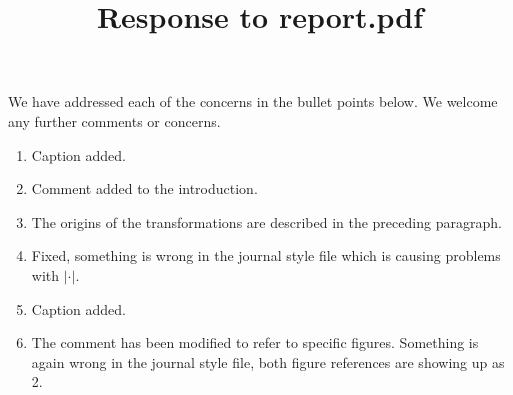 \documentclass{amsart}
\title{Response to report.pdf}
\begin{document}
  
  \maketitle

  We have addressed each of the concerns in the bullet points below.  We welcome any further comments or concerns.
  \begin{enumerate}
    \item Caption added.
    \item Comment added to the introduction.
    \item The origins of the transformations are described in the preceding paragraph.
    \item Fixed, something is wrong in the journal style file which is causing problems with $|\cdot|$.
    \item Caption added.
    \item The comment has been modified to refer to specific figures.  Something is again wrong in the journal style file, both figure references are showing up as 2.
  \end{enumerate}
\end{document}
